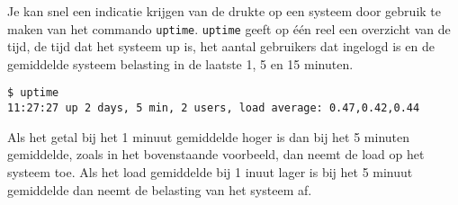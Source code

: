 Je kan snel een indicatie krijgen van de drukte op een systeem door gebruik te maken van het commando \texttt{uptime}. \texttt{uptime} geeft op \'e\'en reel een overzicht van de tijd, de tijd dat het systeem up is, het aantal gebruikers dat ingelogd is en de gemiddelde systeem belasting in de laatste 1, 5 en 15 minuten.

\begin{lstlisting}
$ uptime
11:27:27 up 2 days, 5 min, 2 users, load average: 0.47,0.42,0.44
\end{lstlisting}
Als het getal bij het 1 minuut gemiddelde hoger is dan bij het 5 minuten gemiddelde, zoals in het bovenstaande voorbeeld, dan neemt de load op het systeem toe. Als het load gemiddelde bij 1 inuut lager is bij het 5 minuut gemiddelde dan neemt de belasting van het systeem af.
